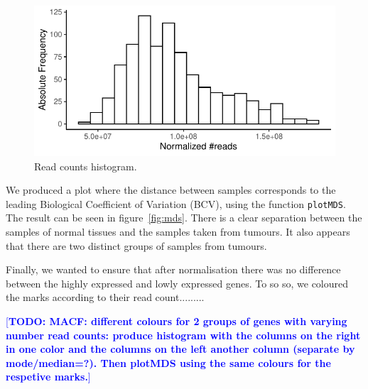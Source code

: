 \documentclass[10pt,twocolumn]{article}\usepackage[]{graphicx}\usepackage[]{color}
\makeatletter
\def\maxwidth{ %
  \ifdim\Gin@nat@width>\linewidth
    \linewidth
  \else
    \Gin@nat@width
  \fi
}
\newenvironment{knitrout}{}{} %
\newcommand{\todo}[1]{\textcolor{blue}{[\textbf{TODO: #1}]} }
\makeatother
\begin{document}
\begin{knitrout}
\color{fgcolor}\begin{figure}[ht]

{\centering \includegraphics[width=\maxwidth]{figure/norm-read-coverage-1} 

}

\caption[Read counts histogram]{Read counts histogram.}\label{fig:norm-read-coverage}
\end{figure}


\end{knitrout}

We produced a plot where the distance between samples corresponds to the leading Biological Coefficient of Variation (BCV), using the function \texttt{plotMDS}. The result can be seen in figure~\ref{fig:mds}. There is a clear separation between the samples of normal tissues and the samples taken from tumours. It also appears that there are two distinct groups of samples from tumours.

Finally, we wanted to ensure that after normalisation there was no difference between the highly expressed and lowly expressed genes. To so so, we coloured the marks according to their read count.........

\todo{MACF: different colours for 2 groups of genes with varying number read counts: produce histogram with the columns on the right in one color and the columns on the left another column (separate by mode/median=?). Then plotMDS using the same colours for the respetive marks.}
\end{document}
